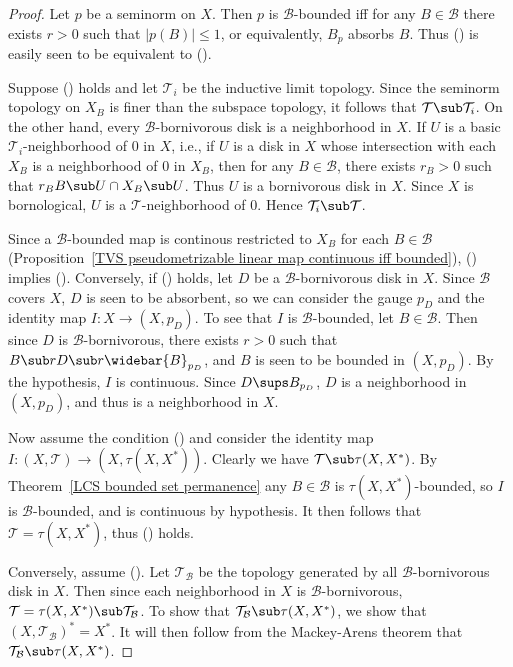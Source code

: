 \begin{proof}
Let $p$ be a seminorm on $X$. Then $p$ is $\mathcal{B}$-bounded iff for any $B\in\mathcal{B}$ there exists $r>0$ such that $|p(B)|\leq 1$, or equivalently, $B_p$ absorbs $B$. Thus () is easily seen to be equivalent to ().\par
Suppose () holds and let $\mathcal{T}_i$ be the inductive limit topology. Since the seminorm topology on $X_B$ is finer than the subspace topology, it follows that $\mathcal{T}\sub\mathcal{T}_i$. On the other hand, every $\mathcal{B}$-bornivorous disk is a neighborhood in $X$. If $U$ is a basic $\mathcal{T}_i$-neighborhood of $0$ in $X$, i.e., if $U$ is a disk in $X$ whose intersection with each $X_B$ is a neighborhood of $0$ in $X_B$, then for any $B\in\mathcal{B}$, there exists $r_B>0$ such that $r_BB\sub U\cap X_B\sub U$. Thus $U$ is a bornivorous disk in $X$. Since $X$ is bornological, $U$ is a $\mathcal{T}$-neighborhood of $0$. Hence $\mathcal{T}_i\sub\mathcal{T}$.\par
Since a $\mathcal{B}$-bounded map is continous restricted to $X_B$ for each $B\in\mathcal{B}$ (Proposition~\ref{TVS pseudometrizable linear map continuous iff bounded}), () implies (). Conversely, if () holds, let $D$ be a $\mathcal{B}$-bornivorous disk in $X$. Since $\mathcal{B}$ covers $X$, $D$ is seen to be absorbent, so we can consider the gauge $p_D$ and the identity map $I:X\to(X,p_D)$. To see that $I$ is $\mathcal{B}$-bounded, let $B\in\mathcal{B}$. Then since $D$ is $\mathcal{B}$-bornivorous, there exists $r>0$ such that $B\sub rD\sub r\widebar{B}_{p_D}$, and $B$ is seen to be bounded in $(X,p_D)$. By the hypothesis, $I$ is continuous. Since $D\sups B_{p_D}$, $D$ is a neighborhood in $(X,p_D)$, and thus is a neighborhood in $X$.\par
Now assume the condition () and consider the identity map $I:(X,\mathcal{T})\to(X,\tau(X,X^*))$. Clearly we have $\mathcal{T}\sub\tau(X,X^*)$. By Theorem~\ref{LCS bounded set permanence} any $B\in\mathcal{B}$ is $\tau(X,X^*)$-bounded, so $I$ is $\mathcal{B}$-bounded, and is continuous by hypothesis. It then follows that $\mathcal{T}=\tau(X,X^*)$, thus () holds.\par
Conversely, assume (). Let $\mathcal{T}_{\mathcal{B}}$ be the topology generated by all $\mathcal{B}$-bornivorous disk in $X$. Then since each neighborhood in $X$ is $\mathcal{B}$-bornivorous, $\mathcal{T}=\tau(X,X^*)\sub\mathcal{T}_{\mathcal{B}}$. To show that $\mathcal{T}_{\mathcal{B}}\sub\tau(X,X^*)$, we show that $(X,\mathcal{T}_{\mathcal{B}})^*=X^*$. It will then follow from the Mackey-Arens theorem that $\mathcal{T}_{\mathcal{B}}\sub\tau(X,X^*)$.\par

\end{proof}
